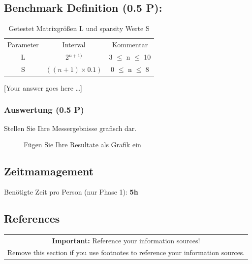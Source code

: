 \documentclass[11pt]{scrartcl}
\newcommand{\youranswerhere}{[Your answer goes here \ldots]}
\begin{document}
\subsection*{Benchmark Definition (0.5 P):}

\begin{table}[h]
	\centering
		\begin{center}
			\begin{tabular}{ c c c }
				Parameter & Interval & Kommentar\\
				L & 2$^{n + 1)}$ & 3 $\leq$ n $\leq$ 10 \\
				S & $((n + 1) \times 0.1)$ & 0 $\leq$ n $\leq$ 8 \\
			\end{tabular}
			\end{center}
	\caption{Getestet Matrixgrößen L und sparsity Werte S}
	\label{tab:MatrixgrößenLUndSparsityWerteS}
\end{table}

\youranswerhere{}

\subsubsection*{Auswertung (0.5 P)}

Stellen Sie Ihre Messergebnisse grafisch dar. 

\begin{figure}
	\centering

	\caption{Fügen Sie Ihre Resultate als Grafik ein}
	\label{fig:results}
\end{figure}


\subsection*{Zeitmamagement}

Benötigte Zeit pro Person (nur Phase 1): \textbf{5h}

\subsection*{References}

\begin{table}[H]
  \centering
  \begin{tabular}{c}
    \hline
    \textbf{Important:} Reference your information sources! \tabularnewline
    Remove this section if you use footnotes to reference your information sources. \tabularnewline
    \hline
  \end{tabular}
\end{table}
\end{document}
